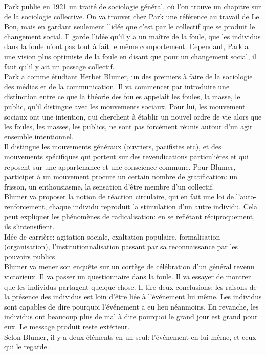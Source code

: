 \documentclass[10pt, a4paper, openany]{book}
\begin{document}
Park publie en 1921 un traité de sociologie général, où l'on trouve un chapitre sur de la sociologie collective. On va trouver chez Park une référence au travail de Le Bon, mais en gardant seulement l'idée que c'est par le collectif que se produit le changement social. Il garde l'idée qu'il y a un maître de la foule, que les individus dans la foule n'ont pas tout à fait le même comportement. Cependant, Park a une vision plus optimiste de la foule en disant que pour un changement social, il faut qu'il y ait un passage collectif. \\
Park a comme étudiant Herbet Blumer, un des premiers à faire de la sociologie des médias et de la communication. Il va commencer par introduire une distinction entre ce que la théorie des foules appelait les foules, la masse, le public, qu'il distingue avec les mouvements sociaux. Pour lui, les mouvement sociaux ont une intention, qui cherchent à établir un nouvel ordre de vie alors que les foules, les masses, les publics, ne sont pas forcément réunis autour d'un agir ensemble intentionnel. \\
Il distingue les mouvements généraux (ouvriers, pacifistes etc), et des mouvements spécifiques qui portent sur des revendications particulières et qui reposent sur une appartenance et une conscience commune. Pour Blumer, participer à un mouvement procure un certain nombre de gratification: un frisson, un enthousiasme, la sensation d'être membre d'un collectif. \\
Blumer va proposer la notion de réaction circulaire, qui en fait une loi de l'auto-renforcement, chaque individu reproduit la stimulation d'un autre individu. Cela peut expliquer les phénomènes de radicalisation: en se reflétant réciproquement, ils s'intensifient. \\
Idée de carrière: agitation sociale, exaltation populaire, formalisation (organisation), l'institutionnalisation passant par sa reconnaissance par les pouvoirs publics. \\
Blumer va mener son enquête sur un cortège de célébration d'un général revenu victorieux. Il va passer un questionnaire dans la foule. Il va essayer de montrer que les individus partagent quelque chose. Il tire deux conclusions: les raisons de la présence des individus est loin d'être liée à l'événement lui même. Les individus sont capables de dire pourquoi l'événement a eu lieu néanmoins. En revanche, les individus ont beaucoup plus de mal à dire pourquoi le grand jour est grand pour eux. Le message produit reste extérieur. \\
Selon Blumer, il y a deux éléments en un seul: l'événement en lui même, et ceux qui le regarde.
\end{document}
